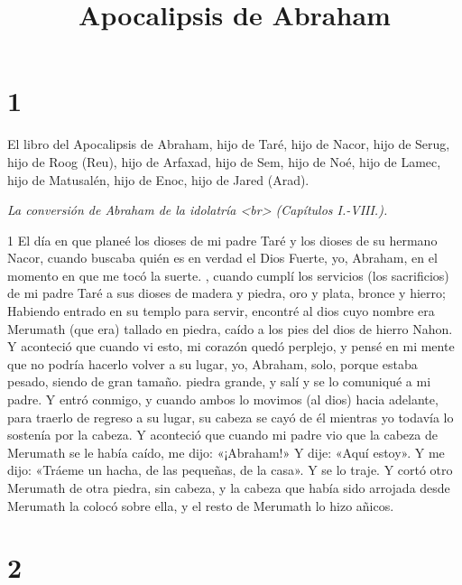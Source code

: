 

\title{Apocalipsis de Abraham}

\chapter{1}

\par El libro del Apocalipsis de Abraham, hijo de Taré, hijo de Nacor, hijo de Serug, hijo de Roog (Reu), hijo de Arfaxad, hijo de Sem, hijo de Noé, hijo de Lamec, hijo de Matusalén, hijo de Enoc, hijo de Jared (Arad).

\par \textit{La conversión de Abraham de la idolatría <br> (Capítulos I.-VIII.).}

\par 1 El día en que planeé los dioses de mi padre Taré y los dioses de su hermano Nacor, cuando buscaba quién es en verdad el Dios Fuerte, yo, Abraham, en el momento en que me tocó la suerte. , cuando cumplí los servicios (los sacrificios) de mi padre Taré a sus dioses de madera y piedra, oro y plata, bronce y hierro; Habiendo entrado en su templo para servir, encontré al dios cuyo nombre era Merumath (que era) tallado en piedra, caído a los pies del dios de hierro Nahon. Y aconteció que cuando vi esto, mi corazón quedó perplejo, y pensé en mi mente que no podría hacerlo volver a su lugar, yo, Abraham, solo, porque estaba pesado, siendo de gran tamaño. piedra grande, y salí y se lo comuniqué a mi padre. Y entró conmigo, y cuando ambos lo movimos (al dios) hacia adelante, para traerlo de regreso a su lugar, su cabeza se cayó de él mientras yo todavía lo sostenía por la cabeza. Y aconteció que cuando mi padre vio que la cabeza de Merumath se le había caído, me dijo: «¡Abraham!» Y dije: «Aquí estoy». Y me dijo: «Tráeme un hacha, de las pequeñas, de la casa». Y se lo traje. Y cortó otro Merumath de otra piedra, sin cabeza, y la cabeza que había sido arrojada desde Merumath la colocó sobre ella, y el resto de Merumath lo hizo añicos.

\chapter{2}

